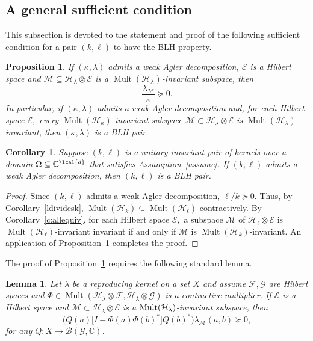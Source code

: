 \documentclass[a4paper,reqno,index]{amsart}
\numberwithin{equation}{section}
\newtheorem{lemma}[theorem]{Lemma}
\newcommand{\CC}{\mathbb{C}}
\newcommand{\Mult}{\operatorname{Mult}}
\newcommand{\cM}{\mathcal{M}}
\newcommand{\cH}{\mathcal{H}}
\newcommand{\HSF}{\mathcal{F}}
\newcommand{\HSE}{\mathcal{E}}
\newcommand{\HSG}{\mathcal{G}}
\newcommand{\genk}{\kappa} %
\newcommand{\genl}{\lambda} %
\newcommand{\opphi}[4]{{#1}\in \Mult({#3},{#4})}
\newtheorem{proposition}[theorem]{Proposition}
\newtheorem{corollary}[theorem]{Corollary}
\theoremstyle{definition}
\begin{document}
 



\subsection{A general sufficient condition} 
 This subsection is devoted to the statement and proof of
 the following sufficient condition for a pair $(k,\ell)$
 to have the BLH property.  




\begin{proposition}\label{gensuffBLH}
 If  $(\genk,\genl)$ admits a weak Agler decomposition,
 $\HSE$ is a Hilbert space and $\cM\subseteq \cH_\genl\otimes\HSE$
 is a $\Mult(\cH_\genl)$-invariant subspace, then
\[
 \frac{\genl_\cM}{\genk} \succeq 0.
\]
 In particular, if $(\genk,\genl)$ admits a weak Agler
 decomposition and, for each Hilbert space $\HSE,$  every $\Mult(\cH_\genk)$-invariant subspace $\mathcal{M}\subset\mathcal{H}_{\genl}\otimes\mathcal{E}$ is 
 $\Mult(\cH_\genl)$-invariant, then $(\genk, \genl)$ is a BLH pair.
\end{proposition}


\begin{corollary}
    \label{c:AD+invariant} 
       Suppose $(k,\ell)$ is a unitary invariant pair of
       kernels over a domain $\Omega\subseteq \CC^\lcal{d}$
       that satisfies Assumption~\ref{assume}. 
       If $(k,\ell)$ admits a weak Agler decomposition, then
       $(k,\ell)$ is a BLH pair. 
\end{corollary}

\begin{proof}
    Since $(k,\ell)$ admits a weak Agler decomposition, $\ell/k\succeq 0.$ Thus, by Corollary~\ref{ldividesk}, 
    $\Mult(\cH_k)\subseteq \Mult(\cH_\ell)$ contractively.
    By Corollary~\ref{c:allequiv}, for each Hilbert space $\HSE,$  a  subspace $\cM$ of $\cH_\ell\otimes \HSE$ is  $\Mult(\cH_\ell)$-invariant  
    invariant if and only if $\cM$ is $\Mult(\cH_k)$-invariant.
    An application of Proposition~\ref{gensuffBLH} completes the proof.
\end{proof}



\noindent The proof of Proposition~\ref{gensuffBLH} requires the following standard lemma. 



\begin{lemma} \label{ellM/k}
Let $\genl$ be a reproducing kernel on a set $X$ and assume 
$\HSF,\HSG$ are Hilbert spaces and 
$\opphi{\Phi}{X}{ \mathcal{H}_{\genl}\otimes\mathcal{F}}{\mathcal{H}_{\genl}\otimes\mathcal{G}}$ is a contractive multiplier.  
If 
$\HSE$ is  a Hilbert space and $\mathcal{M}\subset\mathcal{H}_{\genl}\otimes\mathcal{E}$ is a $\textup{Mult}(\mathcal{H}_{\genl})$-invariant subspace,  then 
\[\big(Q(a)\big[I-\Phi(a)\Phi(b)^*\big]Q(b)^*\big)\genl_\cM(a, b)\succeq 0, \]
for any $Q: X\to \mathcal{B}(\mathcal{G}, \mathbb{C})$. 
\end{lemma}
\end{document}
